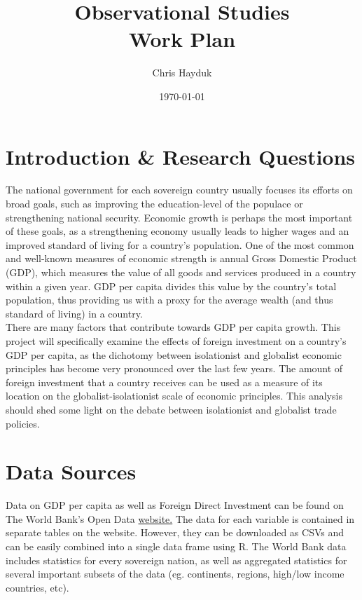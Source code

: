 \documentclass{article}
\title{Observational Studies\\Work Plan}
\author{Chris Hayduk}
\date{\today}
\begin{document}

\doublespacing

\maketitle

\section{Introduction \& Research Questions}
\quad The national government for each sovereign country usually focuses its efforts on broad goals, such as improving the education-level of the populace or strengthening national security. Economic growth is perhaps the most important of these goals, as a strengthening economy usually leads to higher wages and an improved standard of living for a country's population. One of the most common and well-known measures of economic strength is annual Gross Domestic Product (GDP), which measures the value of all goods and services produced in a country within a given year. GDP per capita divides this value by the country's total population, thus providing us with a proxy for the average wealth (and thus standard of living) in a country.\\
\null\quad There are many factors that contribute towards GDP per capita growth. This project will specifically examine the effects of foreign investment on a country's GDP per capita, as the dichotomy between isolationist and globalist economic principles has become very pronounced over the last few years. The amount of foreign investment that a country receives can be used as a measure of its location on the globalist-isolationist scale of economic principles. This analysis should shed some light on the debate between isolationist and globalist trade policies.
\section{Data Sources}
\quad Data on GDP per capita as well as Foreign Direct Investment can be found on The World Bank's Open Data \href{https://data.worldbank.org/}{website.} The data for each variable is contained in separate tables on the website. However, they can be downloaded as CSVs and can be easily combined into a single data frame using R. The World Bank data includes statistics for every sovereign nation, as well as aggregated statistics for several important subsets of the data (eg. continents, regions, high/low income countries, etc).
\end{document}
